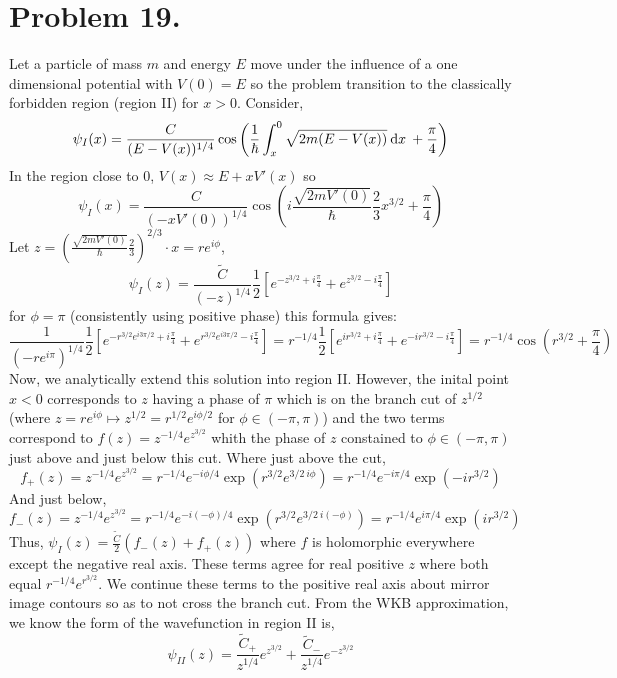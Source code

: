 \documentclass[12pt]{extarticle}
\begin{document}
 
\section*{Problem 19.}
Let a particle of mass $m$ and energy $E$ move under the influence of a one dimensional potential with $V(0) = E$ so the problem transition to the classically forbidden region (region II) for $x > 0$. Consider, 
\[\psi_I(x) = \frac{C}{(E - V(x))^{1/4}} \cos{\left(\frac{1}{\hbar} \int_x^0 \sqrt{2m(E - V(x))} \:  \mathrm{d}x \: + \frac{\pi}{4} \right)}\] 
In the region close to $0$, $V(x) \approx E + x V'(x)$ so
\[\psi_I(x) = \frac{C}{(-x V'(0))^{1/4}} \cos{\left(i \frac{\sqrt{2m V'(0)}}{\hbar} \frac{2}{3} x^{3/2} + \frac{\pi}{4} \right)}\] 
Let $z = \left(\frac{\sqrt{2m V'(0)}}{\hbar} \frac{2}{3} \right)^{2/3} \cdot x = r e^{i \phi}$,
\[\psi_I(z) = \frac{\tilde{C}}{(-z)^{1/4}} \frac{1}{2} \left[ e^{-z^{3/2} + i \frac{\pi}{4}} + e^{z^{3/2} - i \frac{\pi}{4}} \right]   \] 
for $\phi = \pi$ (consistently using positive phase) this formula gives: \[\frac{1}{(-r e^{i \pi})^{1/4}} \frac{1}{2} \left[ e^{-r^{3/2} e^{i 3\pi/2} + i \frac{\pi}{4}} + e^{r^{3/2} e^{i 3\pi/2} - i \frac{\pi}{4}} \right] = r^{-1/4} \frac{1}{2} \left[ e^{i r^{3/2} + i \frac{\pi}{4}} + e^{ - ir^{3/2} - i \frac{\pi}{4}} \right] = r^{-1/4} \cos{\left(r^{3/2} + \frac{\pi}{4} \right)}\]
Now, we analytically extend this solution into region II. However, the inital point $x < 0$ corresponds to $z$ having a phase of $\pi$ which is on the branch cut of $z^{1/2}$ (where $z = re^{i\phi} \mapsto z^{1/2} = r^{1/2} e^{i \phi/2}$ for $\phi \in (-\pi, \pi)$) and the two terms correspond to $f(z) = z^{-1/4} e^{z^{3/2}}$ whith the phase of $z$ constained to $\phi \in (-\pi, \pi)$ just above and just below this cut. Where just above the cut, \[f_{+}(z) = z^{-1/4} e^{z^{3/2}} = r^{-1/4} e^{-i \phi/4} \exp{\left(r^{3/2} e^{ 3/2 \: i \phi} \right)} = r^{-1/4} e^{-i \pi/4} \exp{\left( -i r^{3/2} \right)} \]
And just below, \[ f_{-}(z) = z^{-1/4} e^{z^{3/2}} = r^{-1/4} e^{-i (-\phi)/4} \exp{\left(r^{3/2} e^{ 3/2 \: i (-\phi)} \right)} = r^{-1/4} e^{i \pi/4} \exp{\left(i r^{3/2} \right)} \]
Thus, $\psi_I(z) = \frac{\tilde{C}}{2} (f_-(z) + f_+(z))$ where $f$ is holomorphic everywhere except the negative real axis. These terms agree for real positive $z$ where both equal $r^{-1/4} e^{r^{3/2}}$. We continue these terms to the positive real axis about mirror image contours so as to not cross the branch cut. From the WKB approximation, we know the form of the wavefunction in region II is,
\[\psi_{II}(z) = \frac{\tilde{C}_{+}}{z^{1/4}} e^{z^{3/2}} + \frac{\tilde{C}_{-}}{z^{1/4}} e^{- z^{3/2}}\]
\end{document}
